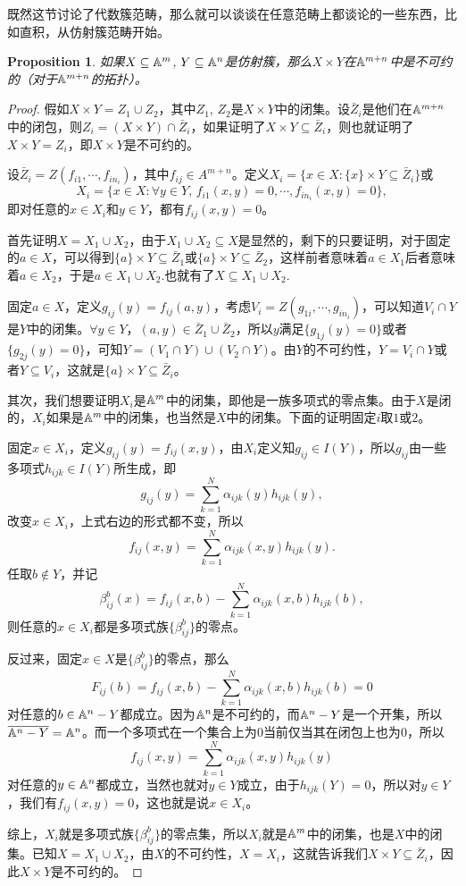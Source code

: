 \documentclass[9pt]{extarticle}
\theoremstyle{plain}%
\newtheorem{pro}[defi]{Proposition}%
\begin{document}
既然这节讨论了代数簇范畴，那么就可以谈谈在任意范畴上都谈论的一些东西，比如直积，从仿射簇范畴开始。
\begin{pro}
	如果$X\subseteq \mathbb{A}^{m}$, $Y\subseteq \mathbb{A}^{n}$是仿射簇，那么$X\times Y$在$\mathbb{A}^{m+n}$中是不可约的（对于$\mathbb{A}^{m+n}$的拓扑）。
	\label{c3:p18}
\end{pro}
\begin{proof}
	假如$X\times Y=Z_1\cup Z_2$，其中$Z_1$, $Z_2$是$X\times Y$中的闭集。设$\bar{Z}_i$是他们在$\mathbb{A}^{m+n}$中的闭包，则$Z_i=(X\times Y)\cap \bar{Z}_i$，如果证明了$X\times Y\subseteq \bar{Z}_i$，则也就证明了$X\times Y=Z_i$，即$X\times Y$是不可约的。

	设$\bar{Z}_i=Z(f_{i1},\cdots,f_{in_i})$，其中$f_{ij}\in A^{m+n}$。定义$X_i=\bigl\{x\in X:\{x\}\times Y\subseteq \bar{Z}_i\bigr\}$或
	\[
		X_i=\bigl\{x\in X:\forall y\in Y,\,f_{i1}(x,y)=0,\cdots ,f_{in_i}(x,y)=0\bigr\},
	\]
	即对任意的$x\in X_i$和$y\in Y$，都有$f_{ij}(x,y)=0$。

	首先证明$X=X_1\cup X_2$，由于$X_1\cup X_2\subseteq X$是显然的，剩下的只要证明，对于固定的$a\in X$，可以得到$\{a\}\times Y\subseteq \bar{Z}_1$或$\{a\}\times Y\subseteq \bar{Z}_2$，这样前者意味着$a\in X_1$后者意味着$a\in X_2$，于是$a\in X_1\cup X_2$.也就有了$X\subseteq X_1\cup X_2$.

	固定$a\in X$，定义$g_{ij}(y)=f_{ij}(a,y)$，考虑$V_i=Z(g_{1i},\cdots,g_{in_i})$，可以知道$V_i\cap Y$是$Y$中的闭集。$\forall y\in Y$，$(a,y)\in \bar{Z}_1 \cup \bar{Z}_2$，所以$y$满足$\{g_{1j}(y)=0\}$或者$\{g_{2j}(y)=0\}$，可知$Y=(V_1\cap Y)\cup (V_2\cap Y)$。由$Y$的不可约性，$Y=V_i\cap Y$或者$Y\subseteq V_i$，这就是$\{a\}\times Y\subseteq \bar{Z}_i$。

	其次，我们想要证明$X_i$是$\mathbb{A}^{m}$中的闭集，即他是一族多项式的零点集。由于$X$是闭的，$X_i$如果是$\mathbb{A}^{m}$中的闭集，也当然是$X$中的闭集。下面的证明固定$i$取$1$或$2$。

	固定$x\in X_i$，定义$g_{ij}(y)=f_{ij}(x,y)$，由$X_i$定义知$g_{ij}\in I(Y)$，所以$g_{ij}$由一些多项式$h_{ijk}\in I(Y)$所生成，即
	\[
		g_{ij}(y)=\sum_{k=1}^N\alpha_{ijk}(y)h_{ijk}(y),
	\]
	改变$x\in X_i$，上式右边的形式都不变，所以
	\[
		f_{ij}(x,y)=\sum_{k=1}^N\alpha_{ijk}(x,y)h_{ijk}(y).
	\]
	任取$b\notin Y$，并记
	\[
		\beta_{ij}^b(x)=f_{ij}(x,b)-\sum_{k=1}^N\alpha_{ijk}(x,b)h_{ijk}(b),
	\]
	则任意的$x\in X_i$都是多项式族$\{\beta_{ij}^b\}$的零点。

	反过来，固定$x\in X$是$\{\beta_{ij}^b\}$的零点，那么
	\[
		F_{ij}(b)=f_{ij}(x,b)-\sum_{k=1}^N\alpha_{ijk}(x,b)h_{ijk}(b)=0
	\]
	对任意的$b\in \mathbb{A}^{n}-Y$都成立。因为$\mathbb{A}^{n}$是不可约的，而$\mathbb{A}^{n}-Y$是一个开集，所以$\overline{\mathbb{A}^{n}-Y}=\mathbb{A}^{n}$。而一个多项式在一个集合上为$0$当前仅当其在闭包上也为$0$，所以
	\[
		f_{ij}(x,y)=\sum_{k=1}^N\alpha_{ijk}(x,y)h_{ijk}(y)
	\]
	对任意的$y\in \mathbb{A}^{n}$都成立，当然也就对$y\in Y$成立，由于$h_{ijk}(Y)=0$，所以对$y\in Y$，我们有$f_{ij}(x,y)=0$，这也就是说$x\in X_i$。

	综上，$X_i$就是多项式族$\{\beta_{ij}^b\}$的零点集，所以$X_i$就是$\mathbb{A}^{m}$中的闭集，也是$X$中的闭集。已知$X=X_1\cup X_2$，由$X$的不可约性，$X=X_i$，这就告诉我们$X\times Y\subseteq \bar{Z}_i$，因此$X\times Y$是不可约的。
\end{proof}
\end{document}

